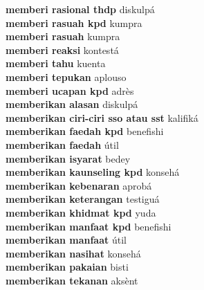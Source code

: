 \textbf{ memberi rasional thdp  } diskulpá \\
\textbf{ memberi rasuah kpd  } kumpra \\
\textbf{ memberi rasuah  } kumpra \\
\textbf{ memberi reaksi  } kontestá \\
\textbf{ memberi tahu  } kuenta \\
\textbf{ memberi tepukan  } aplouso \\
\textbf{ memberi ucapan kpd  } adrès \\
\textbf{ memberikan alasan  } diskulpá \\
\textbf{ memberikan ciri-ciri sso atau sst  } kalifiká \\
\textbf{ memberikan faedah kpd  } benefishi \\
\textbf{ memberikan faedah  } útil \\
\textbf{ memberikan isyarat  } bedey \\
\textbf{ memberikan kaunseling kpd  } konsehá \\
\textbf{ memberikan kebenaran  } aprobá \\
\textbf{ memberikan keterangan  } testiguá \\
\textbf{ memberikan khidmat kpd  } yuda \\
\textbf{ memberikan manfaat kpd  } benefishi \\
\textbf{ memberikan manfaat  } útil \\
\textbf{ memberikan nasihat  } konsehá \\
\textbf{ memberikan pakaian  } bisti \\
\textbf{ memberikan tekanan  } aksènt \\
